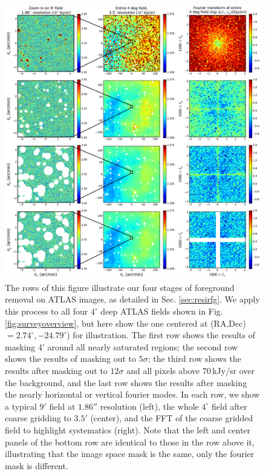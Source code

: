 \documentclass{emulateapj}
\begin{document}
\begin{figure}[h]
\centering
\includegraphics[width=7in]{images/big_foreground_masking_study_2_magoffset=20_56+0_274.pdf}
\caption{The rows of this figure illustrate our four stages of foreground removal on ATLAS images, as detailed in Sec. \ref{sec:resirfg}. We apply this process to all four $4^\circ$ deep ATLAS fields shown in Fig. \ref{fig:surveyoverview}, but here show the one centered at (RA,Dec)$=2.74^\circ, -24.79^\circ$) for illustration. The first row shows the results of masking 4' around all nearly saturated regions; the second row shows the results of masking out to $5\sigma$; the third row shows the results after masking out to $12\sigma$ and all pixels above 70\,kJy/sr over the background, and the last row shows the results after masking the nearly horizontal or vertical fourier modes. In each row, we show a typical $9'$ field at $1.86''$ resolution (left), the whole $4^\circ$ field after coarse gridding to $3.5'$ (center), and the FFT of the coarse gridded field to highlight systematics (right). Note that the left and center panels of the bottom row are identical to those in the row above it, illustrating that the image space mask is the same, only the fourier mask is different.}
\label{fig:bigfgmaskingstudy}
\end{figure}
\end{document}
